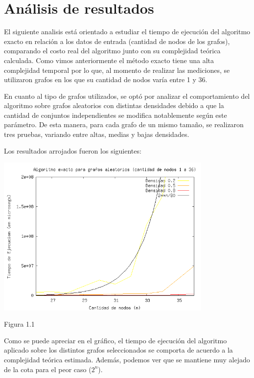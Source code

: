 \documentclass[a4paper,11pt] {article}
\begin{document}
\section*{An\'alisis de resultados}

El siguiente analisis est\'a orientado a estudiar el tiempo de ejecuci\'on del algoritmo exacto en relaci\'on a los datos de entrada (cantidad de nodos de los grafos), comparando el costo real del algoritmo junto con su complejidad te\'orica calculada. Como vimos anteriormente el m\'etodo exacto tiene una alta complejidad temporal por lo que, al momento de realizar las mediciones, se utilizaron grafos en los que su cantidad de nodos var\'ia entre 1 y 36.

En cuanto al tipo de grafos utilizados, se opt\'o por analizar el comportamiento del algoritmo sobre grafos aleatorios con distintas densidades debido a que la cantidad de conjuntos independientes se modifica notablemente seg\'un este par\'ametro. De esta manera, para cada grafo de un mismo tama\~{n}o, se realizaron tres pruebas, variando entre altas, medias y bajas densidades.

Los resultados arrojados fueron los siguientes:

\begin{center}
 \includegraphics[width=0.8\textwidth]{graficos/tiemposExacto.png}
\begin{center}
Figura 1.1
\end{center}
\end{center}

Como se puede apreciar en el gr\'afico, el tiempo de ejecuci\'on del algoritmo aplicado sobre los distintos grafos seleccionados se comporta de acuerdo a la complejidad te\'orica estimada. Adem\'as, podemos ver que se mantiene muy alejado de la cota para el peor caso ($2^{n}$).
\end{document}
